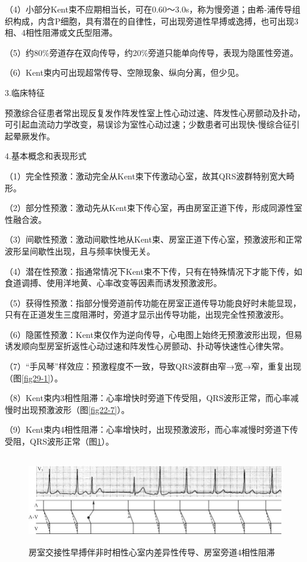 （4）小部分Kent束不应期相当长，可在0.60～3.0s，称为慢旁道；由希-浦传导组织构成，内含P细胞，具有潜在的自律性，可出现旁道性早搏或逸搏，也可出现3相、4相性阻滞或文氏型阻滞。

（5）约80\%旁道存在双向传导，约20\%旁道只能单向传导，表现为隐匿性旁道。

（6）Kent束内可出现超常传导、空隙现象、纵向分离，但少见。

3.临床特征

预激综合征患者常出现反复发作阵发性室上性心动过速、阵发性心房颤动及扑动，可引起血流动力学改变，易误诊为室性心动过速；少数患者可出现快-慢综合征引起晕厥发作。

4.基本概念和表现形式

（1）完全性预激：激动完全从Kent束下传激动心室，故其QRS波群特别宽大畸形。

（2）部分性预激：激动先从Kent束下传心室，再由房室正道下传，形成同源性室性融合波。

（3）间歇性预激：激动间歇性地从Kent束、房室正道下传心室，预激波形和正常波形呈间歇性出现，且与频率快慢无关。

（4）潜在性预激：指通常情况下Kent束不下传，只有在特殊情况下才能下传，如食道调搏、使用洋地黄、心率改变等因素而诱发预激波形。

（5）获得性预激：指部分慢旁道前传功能在房室正道传导功能良好时未能显现，只有在正道发生三度阻滞时，旁道才显示出传导功能，出现完全性预激波形。

（6）隐匿性预激：Kent束仅作为逆向传导，心电图上始终无预激波形出现，但易诱发顺向型房室折返性心动过速和阵发性心房颤动、扑动等快速性心律失常。

（7）“手风琴”样效应：预激程度不一致，导致QRS波群由窄→宽→窄，重复出现（图\ref{fig29-1}）。

（8）Kent束内3相性阻滞：心率增快时旁道下传受阻，QRS波形正常，而心率减慢时出现预激波形（图\ref{fig22-7}）。

（9）Kent束内4相性阻滞：心率增快时，出现预激波形，而心率减慢时旁道下传受阻，QRS波形正常（图\ref{fig29-2}）。

\begin{figure}[!htbp]
 \centering
 \includegraphics[width=5.73958in,height=1.54167in]{./images/Image00482.jpg}
 \captionsetup{justification=centering}
 \caption{房室交接性早搏伴非时相性心室内差异性传导、房室旁道4相性阻滞}
 \label{fig29-2}
  \end{figure} 


